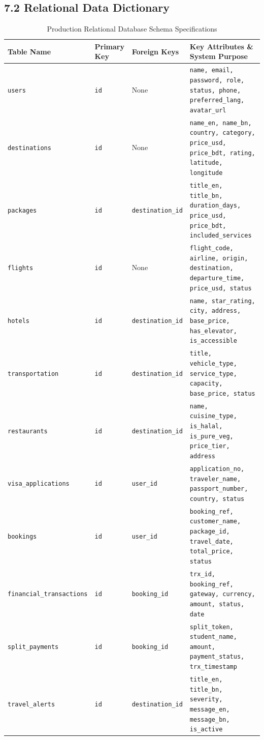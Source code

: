\documentclass[11pt,a4paper]{article}
\begin{document}
\subsection{7.2 Relational Data Dictionary}
\begin{table}[H]
\centering
\scriptsize
\begin{tabularx}{\textwidth}{l l l X}
\toprule
\textbf{Table Name} & \textbf{Primary Key} & \textbf{Foreign Keys} & \textbf{Key Attributes \& System Purpose} \\
\midrule
\texttt{users} & \texttt{id} & None & \texttt{name, email, password, role, status, phone, preferred\_lang, avatar\_url} \\
\addlinespace
\texttt{destinations} & \texttt{id} & None & \texttt{name\_en, name\_bn, country, category, price\_usd, price\_bdt, rating, latitude, longitude} \\
\addlinespace
\texttt{packages} & \texttt{id} & \texttt{destination\_id} & \texttt{title\_en, title\_bn, duration\_days, price\_usd, price\_bdt, included\_services} \\
\addlinespace
\texttt{flights} & \texttt{id} & None & \texttt{flight\_code, airline, origin, destination, departure\_time, price\_usd, status} \\
\addlinespace
\texttt{hotels} & \texttt{id} & \texttt{destination\_id} & \texttt{name, star\_rating, city, address, base\_price, has\_elevator, is\_accessible} \\
\addlinespace
\texttt{transportation}& \texttt{id} & \texttt{destination\_id} & \texttt{title, vehicle\_type, service\_type, capacity, base\_price, status} \\
\addlinespace
\texttt{restaurants} & \texttt{id} & \texttt{destination\_id} & \texttt{name, cuisine\_type, is\_halal, is\_pure\_veg, price\_tier, address} \\
\addlinespace
\texttt{visa\_applications} & \texttt{id} & \texttt{user\_id} & \texttt{application\_no, traveler\_name, passport\_number, country, status} \\
\addlinespace
\texttt{bookings} & \texttt{id} & \texttt{user\_id} & \texttt{booking\_ref, customer\_name, package\_id, travel\_date, total\_price, status} \\
\addlinespace
\texttt{financial\_transactions} & \texttt{id} & \texttt{booking\_id} & \texttt{trx\_id, booking\_ref, gateway, currency, amount, status, date} \\
\addlinespace
\texttt{split\_payments} & \texttt{id} & \texttt{booking\_id} & \texttt{split\_token, student\_name, amount, payment\_status, trx\_timestamp} \\
\addlinespace
\texttt{travel\_alerts} & \texttt{id} & \texttt{destination\_id} & \texttt{title\_en, title\_bn, severity, message\_en, message\_bn, is\_active} \\
\bottomrule
\end{tabularx}
\caption{Production Relational Database Schema Specifications}
\end{table}
\end{document}
